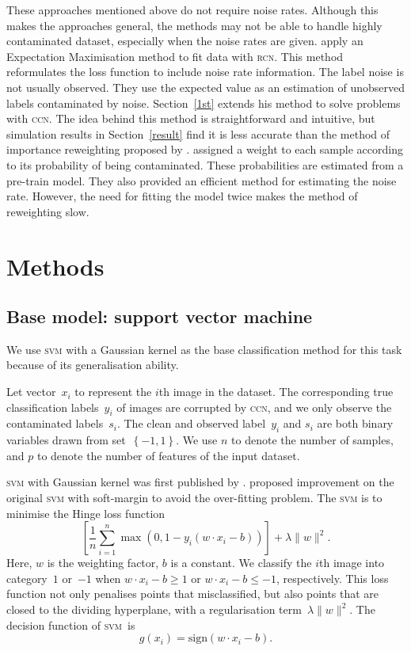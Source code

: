 \documentclass[12pt]{article} %
\newcommand{\svm}{\textsc{svm}}
\begin{document}
These approaches mentioned above do not require noise rates. Although this makes the approaches general, the methods may not be able to handle highly contaminated dataset, especially when the noise rates are given. \citet{pmlr-v20-biggio11} apply an Expectation Maximisation method to fit data with \textsc{rcn}. This method reformulates the loss function to include noise rate information. The label noise is not usually observed. They use the expected value as an estimation of unobserved labels contaminated by noise. Section~\ref{1st} extends his method to solve problems with \textsc{ccn}. The idea behind this method is straightforward and intuitive, but  simulation results in Section~\ref{result} find it is less accurate than the method of importance reweighting proposed by \citet{liu2016classification}. \citet{liu2016classification} assigned a weight to each sample according to its probability of being contaminated. These probabilities are estimated from a pre-train model. They also provided an efficient method for estimating the noise rate. However, the need for fitting the model twice makes the method of reweighting slow.

\section{Methods}\label{method}


\subsection{Base model: support vector machine}\label{sec:over}
We use \textsc{svm} with a Gaussian kernel as the base classification method for this task because of its generalisation ability.

Let vector~$x_i$ to represent the $i$th image in the dataset. The corresponding true classification labels~$y_i$ of images are corrupted by \textsc{ccn}, and we only observe the contaminated labels~$s_i$. The clean and observed label~$y_i$ and $s_i$ are both binary variables drawn from set~$\left\{-1,1\right\}$. We use $n$ to denote the number of samples, and $p$ to denote the number of features of the input dataset.

\textsc{svm} with Gaussian kernel was first published by \citet{Boser:1992:TAO:130385.130401}.
\citet{Cortes1995} proposed improvement on the original \textsc{svm} with soft-margin  to  avoid the over-fitting problem. The \textsc{svm} is to minimise the Hinge loss function
\begin{equation*}
\left[{\frac {1}{n}}\sum _{i=1}^{n}\max \left(0,1-y_{i}(w\cdot x_{i}-b)\right)\right]+\lambda \lVert w\rVert ^{2}.
\end{equation*}
Here, $w$ is the weighting factor, $b$ is a constant. We classify the $i$th image into category~$1$ or~$-1$ when $w\cdot x_{i}-b\geq1$ or $w\cdot x_{i}-b\leq-1$, respectively. This loss function not only penalises points that misclassified, but also points that are closed to the dividing hyperplane, with a regularisation term~$\lambda \lVert w\rVert ^{2}$. The decision function of \svm\ is
\begin{equation}\label{eq:decision}
 g(x_{i})=\text{sign}(w\cdot x_{i}-b).
\end{equation}
\end{document}
